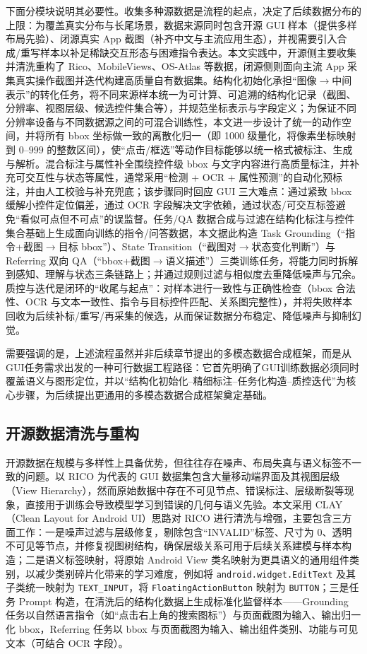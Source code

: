 下面分模块说明其必要性。收集多种源数据是流程的起点，决定了后续数据分布的上限：为覆盖真实分布与长尾场景，数据来源同时包含开源 GUI 样本（提供多样布局先验）、闭源真实 App 截图（补齐中文与主流应用生态），并视需要引入合成/重写样本以补足稀缺交互形态与困难指令表达。本文实践中，开源侧主要收集并清洗重构了 Rico、MobileViews、OS-Atlas 等数据，闭源侧则面向主流 App 采集真实操作截图并迭代构建高质量自有数据集。结构化初始化承担“图像$\rightarrow$中间表示”的转化任务，将不同来源样本统一为可计算、可追溯的结构化记录（截图、分辨率、视图层级、候选控件集合等），并规范坐标表示与字段定义；为保证不同分辨率设备与不同数据源之间的可混合训练性，本文进一步设计了统一的动作空间，并将所有 bbox 坐标做一致的离散化归一（即 1000 级量化，将像素坐标映射到 $0\text{--}999$ 的整数区间），使“点击/框选”等动作目标能够以统一格式被标注、生成与解析。混合标注与属性补全围绕控件级 bbox 与文字内容进行高质量标注，并补充可交互性与状态等属性，通常采用“检测 + OCR + 属性预测”的自动化预标注，并由人工校验与补充兜底；该步骤同时回应 GUI 三大难点：通过紧致 bbox 缓解小控件定位偏差，通过 OCR 字段解决文字依赖，通过状态/可交互标签避免“看似可点但不可点”的误监督。任务/QA 数据合成与过滤在结构化标注与控件集合基础上生成面向训练的指令/问答数据，本文据此构造 Task Grounding（“指令+截图$\rightarrow$目标 bbox”）、State Transition（“截图对$\rightarrow$状态变化判断”）与 Referring 双向 QA（“bbox+截图$\rightarrow$语义描述”）三类训练任务，将能力同时拆解到感知、理解与状态三条链路上；并通过规则过滤与相似度去重降低噪声与冗余。质控与迭代是闭环的“收尾与起点”：对样本进行一致性与正确性检查（bbox 合法性、OCR 与文本一致性、指令与目标控件匹配、关系图完整性），并将失败样本回收为后续补标/重写/再采集的候选，从而保证数据分布稳定、降低噪声与抑制幻觉。

需要强调的是，上述流程虽然并非后续章节提出的多模态数据合成框架，而是从GUI任务需求出发的一种可行数据工程路径：它首先明确了GUI训练数据必须同时覆盖语义与图形定位，并以“结构化初始化--精细标注--任务化构造--质控迭代”为核心步骤，为后续提出更通用的多模态数据合成框架奠定基础。

\subsection{开源数据清洗与重构}
开源数据在规模与多样性上具备优势，但往往存在噪声、布局失真与语义标签不一致的问题。以 RICO 为代表的 GUI 数据集\citep{deka2017rico}包含大量移动端界面及其视图层级（View Hierarchy），然而原始数据中存在不可见节点、错误标注、层级断裂等现象，直接用于训练会导致模型学习到错误的几何与语义先验。本文采用 CLAY（Clean Layout for Android UI）思路对 RICO 进行清洗与增强\citep{li2022clay}，主要包含三方面工作：一是噪声过滤与层级修复，剔除包含“INVALID”标签、尺寸为 0、透明不可见等节点，并修复视图树结构，确保层级关系可用于后续关系建模与样本构造；二是语义标签映射，将原始 Android View 类名映射为更具语义的通用组件类别，以减少类别碎片化带来的学习难度，例如将 \texttt{android.widget.\allowbreak EditText} 及其子类统一映射为 \texttt{TEXT\_INPUT}，将 \texttt{FloatingActionButton} 映射为 \texttt{BUTTON}；三是任务 Prompt 构造，在清洗后的结构化数据上生成标准化监督样本——Grounding 任务以自然语言指令（如“点击右上角的搜索图标”）与页面截图为输入、输出归一化 bbox，Referring 任务以 bbox 与页面截图为输入、输出组件类别、功能与可见文本（可结合 OCR 字段）。

